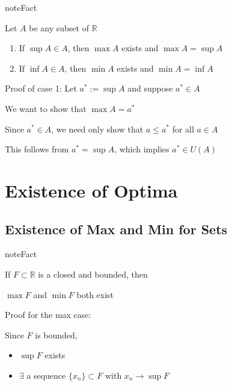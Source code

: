 \documentclass[letterpaper,10pt,english]{jupyterBook}
\begin{document}
\begin{sphinxadmonition}{note}{Fact}

\sphinxAtStartPar
Let \(A\) be any subset of \(\mathbb{R}\)
\end{sphinxadmonition}
\begin{enumerate}
%
\item {} 
\sphinxAtStartPar
If \(\sup A \in A\), then \(\max A\) exists and \(\max A = \sup A\)

\item {} 
\sphinxAtStartPar
If \(\inf A \in A\), then \(\min A\) exists and \(\min A = \inf A\)

\end{enumerate}

\sphinxAtStartPar
Proof of case 1: Let \(a^* := \sup A\) and suppose \(a^* \in A\)

\sphinxAtStartPar
We want to show that \(\max A = a^*\)

\sphinxAtStartPar
Since \(a^* \in A\), we need only show that \(a \leq a^*\) for all \(a \in A\)

\sphinxAtStartPar
This follows from \(a^* = \sup A\), which implies \(a^* \in U(A)\)


\section{Existence of Optima}
\label{\detokenize{06.optimization_fundamentals:existence-of-optima}}

\subsection{Existence of Max and Min for Sets}
\label{\detokenize{06.optimization_fundamentals:existence-of-max-and-min-for-sets}}
\begin{sphinxadmonition}{note}{Fact}

\sphinxAtStartPar
If \(F \subset \mathbb{R}\) is a closed and bounded, then
\end{sphinxadmonition}

\sphinxAtStartPar
\(\max F\) and \(\min F\) both exist

\sphinxAtStartPar
Proof for the max case:

\sphinxAtStartPar
Since \(F\) is bounded,
\begin{itemize}
\item {} 
\sphinxAtStartPar
\(\sup F\) exists

\item {} 
\sphinxAtStartPar
\(\exists\) a sequence \(\{x_n\} \subset F\) with \(x_n \to \sup F\)

\end{itemize}
\end{document}
